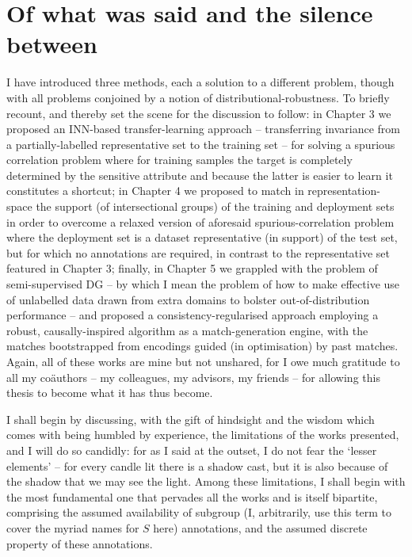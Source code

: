 \section*{Of what was said and the silence between}\label{sec:what-was-said}
%
I have introduced three methods, each a solution to a different problem, though with all problems
conjoined by a notion of distributional-robustness.
%
%
To briefly recount, and thereby set the scene for the discussion to follow: in Chapter 3 we
proposed an INN-based transfer-learning approach -- transferring invariance from a
partially-labelled representative set to the training set -- for solving a spurious correlation
problem where for training samples the target is completely determined by the sensitive attribute
and because the latter is easier to learn it constitutes a shortcut;
%
in Chapter 4 we proposed to match in representation-space the support (of intersectional groups) of
the training and deployment sets in order to overcome a relaxed version of aforesaid
spurious-correlation problem where the deployment set is a dataset representative (in support) of
the test set, but for which no annotations are required, in contrast to the representative set
featured in Chapter 3;
%
finally, in Chapter 5 we grappled with the problem of semi-supervised DG -- by which I mean the
problem of how to make effective use of unlabelled data drawn from extra domains to bolster
out-of-distribution performance -- and proposed a consistency-regularised approach employing a
robust, causally-inspired algorithm as a match-generation engine, with the matches bootstrapped
from encodings guided (in optimisation) by past matches.
%
Again, all of these works are mine but not unshared, for I owe much gratitude to all my
co{\"a}uthors -- my colleagues, my advisors, my friends -- for allowing this thesis to become what
it has thus become.

%
%
I shall begin by discussing, with the gift of hindsight and the wisdom which comes with being
humbled by experience, the limitations of the works presented, and I will do so candidly: for as I
said at the outset, I do not fear the `lesser elements' -- for every candle lit there is a shadow
cast, but it is also because of the shadow that we may see the light.
%
Among these limitations, I shall begin with the most fundamental one that pervades all the works
and is itself bipartite, comprising the assumed availability of subgroup (I, arbitrarily, use this
term to cover the myriad names for \(S\) here) annotations, and the assumed discrete property of
these annotations.

